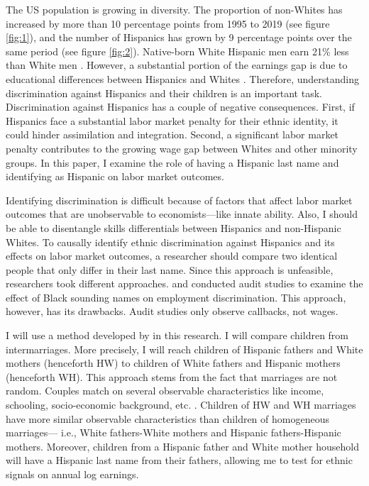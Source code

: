 \documentclass[12pt, fullpage]{article}
\begin{document}
The US population is growing in diversity. The proportion of non-Whites has increased by more than 10 percentage points from 1995 to 2019 (see figure \ref{fig:1}), and the number of Hispanics has grown by 9 percentage points over the same period (see figure \ref{fig:2}). Native-born White Hispanic men earn 21\% less than White men \citep{duncan2018identifying}. However, a substantial portion of the earnings gap is due to educational differences between Hispanics and Whites \citep{duncan2006hispanics, duncan2018socioeconomic}. Therefore, understanding discrimination against Hispanics and their children is an important task. Discrimination against Hispanics has a couple of negative consequences. First, if Hispanics face a substantial labor market penalty for their ethnic identity, it could hinder assimilation and integration. Second, a significant labor market penalty contributes to the growing wage gap between Whites and other minority groups. In this paper, I examine the role of having a Hispanic last name and identifying as Hispanic on labor market outcomes. 


Identifying discrimination is difficult because of factors that affect labor market outcomes that are unobservable to economists---like innate ability. Also, I should be able to disentangle skills differentials between Hispanics and non-Hispanic Whites. To causally identify ethnic discrimination against Hispanics and its effects on labor market outcomes, a researcher should compare two identical people that only differ in their last name. Since this approach is unfeasible, researchers took different approaches. \citet{bertrand2004emily} and \citet{fryer2004causes} conducted audit studies to examine the effect of Black sounding names on employment discrimination. This approach, however, has its drawbacks. Audit studies only observe callbacks, not wages. 

I will use a method developed by \citet{rubinstein2014pride} in this research. I will compare children from intermarriages. More precisely, I will reach children of Hispanic fathers and White mothers (henceforth HW) to children of White fathers and Hispanic mothers (henceforth  WH). This approach stems from the fact that marriages are not random. Couples match on several observable characteristics like income, schooling, socio-economic background, etc. \citep{averettBetterWorseRelationship2008, averettEconomicRealityBeauty1996, beckerTheoryMarriagePart1973, beckerTheoryMarriagePart1974, beckerTreatiseFamily1993, browningCollectiveUnitaryModels2006, chiapporiFatterAttractionAnthropometric2012}. Children of HW and WH marriages have more similar observable characteristics than children of homogeneous marriages--- i.e., White fathers-White mothers and Hispanic fathers-Hispanic mothers. Moreover, children from a Hispanic father and White mother household will have a Hispanic last name from their fathers, allowing me to test for ethnic signals on annual log earnings.
\end{document}
